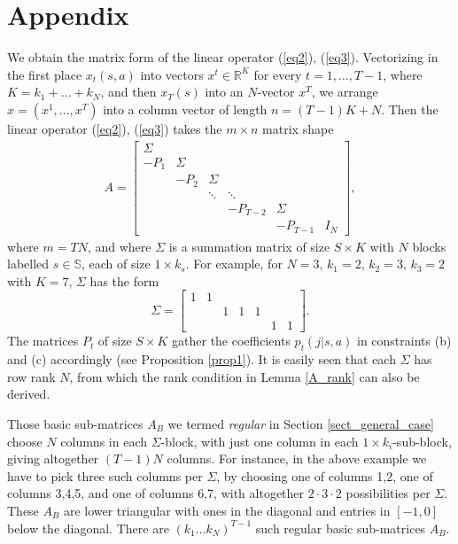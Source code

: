 \documentclass{article}
\theoremstyle{definition}
\numberwithin{equation}{section}
\begin{document}
\section{Appendix}

We obtain the matrix form of the linear operator (\ref{eq2}), (\ref{eq3}).
Vectorizing in the first place  $x_t(s,a)$ into vectors $x^t\in \mathbb R^K$ for every
$t=1,\dots,T-1$, where $K = k_1 + \dots + k_N$, and then $x_T(s)$ into an $N$-vector $x^T$,
we arrange
$x = (x^{1},\dots,x^{T})$ into a column  vector of length
$n=(T-1)K+N$. Then the linear operator (\ref{eq2}), (\ref{eq3}) takes the 
$m \times n$ matrix shape
\begin{align*}
A=
    \begin{bmatrix}
        \Sigma &          &  & \\
         -P_1  &  \Sigma  &        & & \\
            &      -P_2   & \Sigma      &  &  \\
            &              &\!\!\ddots & \!\!\ddots  & &\\
            &               &        &      -P_{T-2}     & \Sigma \\ 
            &               &        &             &   -P_{T-1}  & I_N
    \end{bmatrix},
\end{align*}
where $m=TN$, and 
where $\Sigma$ is a summation matrix of size $S\times K$ with $N$ blocks labelled $s\in \mathbb{S}$, each of size $1 \times k_s$. For example, for $N=3$, $k_1=2$, $k_2=3$, $k_3=2$ with $K=7$, $\Sigma$ has the form
$$
\Sigma = \begin{bmatrix}
    1&1&    \\
     & & 1&1&1&   \\
     & &  & & & 1 & 1
\end{bmatrix}.
$$
The matrices $P_{t}$ of size $S\times K$ gather the coefficients $p_t(j|s,a)$ in constraints (b) and (c)
accordingly (see Proposition \ref{prop1}). It is easily seen that each $\Sigma$ has row rank $N$, from which the rank
condition in Lemma \ref{A_rank} can also be derived. 

Those  basic sub-matrices $A_B$ we termed {\it regular} in Section \ref{sect_general_case} choose $N$ columns in each 
$\Sigma$-block,
with just
one column in each $1\times k_i$-sub-block, giving altogether $(T-1)N$ columns. For instance, in the above example we have to pick three 
such columns per $\Sigma$,  by choosing
one of columns 1,2, one of columns 3,4,5, and one of columns 6,7, with altogether $2\cdot 3 \cdot 2$
possibilities per $\Sigma$. 
These $A_B$ are lower triangular with ones in the diagonal and entries in $[-1,0]$ below the diagonal. There are $(k_1 \dots k_N)^{T-1}$ such regular
basic sub-matrices $A_B$.
\end{document}
